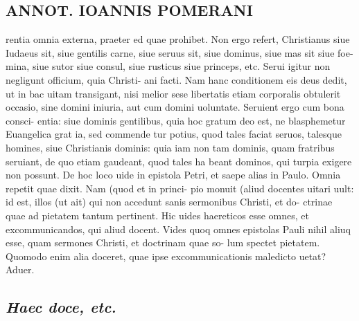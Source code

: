 \documentclass{article}
\begin{document}
\begin{pages}
\section*{ANNOT. IOANNIS POMERANI }\pstart rentia omnia externa, praeter ed quae prohibet. Non ergo refert, Christianus siue Iudaeus sit, siue gentilis carne, siue seruus sit, siue dominus, siue mas sit siue foe- mina, siue sutor siue consul, siue rusticus siue princeps, etc. Serui igitur non negligunt officium, quia Christi- ani facti. Nam hanc conditionem eis deus dedit, ut in bac uitam transigant, nisi melior sese libertatis etiam corporalis obtulerit occasio, sine domini iniuria, aut cum domini uoluntate. Seruient ergo cum bona consci- entia: siue dominis gentilibus, quia hoc gratum deo est, ne blasphemetur Euangelica grat ia, sed commende tur potius, quod tales faciat seruos, talesque homines, siue Christianis dominis: quia iam non tam dominis, quam fratribus seruiant, de quo etiam gaudeant, quod tales ha beant dominos, qui turpia exigere non possunt. De hoc loco uide in epistola Petri, et saepe alias in Paulo.  \pend\pstart Omnia repetit quae dixit. Nam (quod et in princi- pio monuit (aliud docentes uitari uult: id est, illos (ut ait) qui non accedunt sanis sermonibus Christi, et do- ctrinae quae ad pietatem tantum pertinent. Hic uides haereticos esse omnes, et excommunicandos, qui aliud docent. Vides quoq omnes epistolas Pauli nihil aliuq esse, quam sermones Christi, et doctrinam quae so- lum spectet pietatem. Quomodo enim alia doceret, quae ipse excommunicationis maledicto uetat? Aduer.  \pend
{}
{}
\subsection*{\textit{Haec doce, etc. }}

\end{pages}
\end{document}
